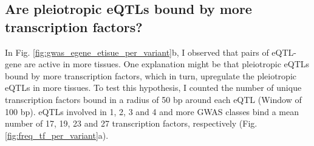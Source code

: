 %
%

%
\subsection*{Are pleiotropic eQTLs bound by more transcription factors?}
%

In Fig. \ref{fig:gwas_egene_etisue_per_variant}b, I observed that pairs of eQTL-gene are active in more tissues.
%
One explanation might be that pleiotropic eQTLs bound by more transcription factors, which in turn, upregulate the pleiotropic eQTLs in more tissues.
%
To test this hypothesis, I counted the number of unique transcription factors bound in a radius of 50 bp around each eQTL (Window of 100 bp).
%
eQTLs involved in 1, 2, 3 and 4 and more GWAS classes bind a mean number of 17,
19, 23 and 27 transcription factors, respectively (Fig. \ref{fig:freq_tf_per_variant}a).

